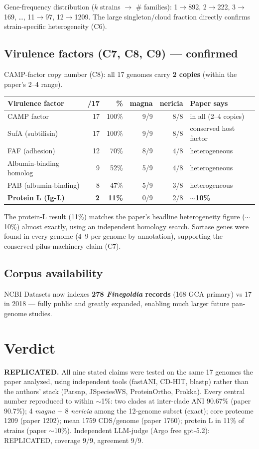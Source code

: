 \documentclass[11pt]{article}
\begin{document}
Gene-frequency distribution ($k$ strains $\to$ \# families): 1$\to$892, 2$\to$222, 3$\to$169, \ldots, 11$\to$97, 12$\to$1209. The large singleton/cloud fraction directly confirms strain-specific heterogeneity (C6).

\subsection{Virulence factors (C7, C8, C9) --- confirmed}
CAMP-factor copy number (C8): all 17 genomes carry \textbf{2 copies} (within the paper's 2--4 range).

\begin{tabular}{lrrrrl}
\toprule
Virulence factor & /17 & \% & magna & nericia & Paper says \\
\midrule
CAMP factor              & 17 & 100\% & 9/9 & 8/8 & in all (2--4 copies) \\
SufA (subtilisin)        & 17 & 100\% & 9/9 & 8/8 & conserved host factor \\
FAF (adhesion)           & 12 & 70\%  & 8/9 & 4/8 & heterogeneous \\
Albumin-binding homolog  &  9 & 52\%  & 5/9 & 4/8 & heterogeneous \\
PAB (albumin-binding)    &  8 & 47\%  & 5/9 & 3/8 & heterogeneous \\
\textbf{Protein L (Ig-L)} & \textbf{2} & \textbf{11\%} & 0/9 & 2/8 & \textbf{$\sim$10\%} \\
\bottomrule
\end{tabular}

The protein-L result (11\%) matches the paper's headline heterogeneity figure ($\sim$10\%) almost exactly, using an independent homology search. Sortase genes were found in every genome (4--9 per genome by annotation), supporting the conserved-pilus-machinery claim (C7).

\subsection{Corpus availability}
NCBI Datasets now indexes \textbf{278 \emph{Finegoldia} records} (168 GCA primary) vs 17 in 2018 --- fully public and greatly expanded, enabling much larger future pan-genome studies.

\section{Verdict}
\textbf{REPLICATED.} All nine stated claims were tested on the same 17 genomes the paper analyzed, using independent tools (fastANI, CD-HIT, blastp) rather than the authors' stack (Parsnp, JSpeciesWS, ProteinOrtho, Prokka). Every central number reproduced to within $\sim$1\%: two clades at inter-clade ANI 90.67\% (paper 90.7\%); 4 \emph{magna} + 8 \emph{nericia} among the 12-genome subset (exact); core proteome 1209 (paper 1202); mean 1759 CDS/genome (paper 1760); protein L in 11\% of strains (paper $\sim$10\%). Independent LLM-judge (Argo free gpt-5.2): REPLICATED, coverage 9/9, agreement 9/9.
\end{document}
